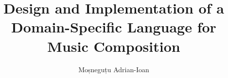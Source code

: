 \documentclass[12pt]{report}
\begin{document}
\title{Design and Implementation of a Domain-Specific Language for Music Composition}
\author{Moșneguțu Adrian-Ioan}

\maketitle

\newpage
\thispagestyle{empty}
\mbox{}
\newpage
{}



\tableofcontents

\newpage
{}










\end{document}
